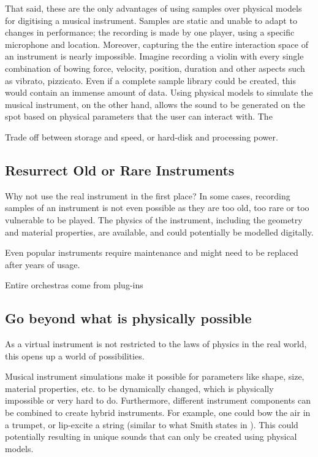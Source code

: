 That said, these are the only advantages of using samples over physical models for digitising a musical instrument. Samples are static and unable to adapt to changes in performance; the recording is made by one player, using a specific microphone and location. Moreover, capturing the the entire interaction space of an instrument is nearly impossible. Imagine recording a violin with every single combination of bowing force, velocity, position, duration and other aspects such as vibrato, pizzicato. Even if a complete sample library could be created, this would contain an immense amount of data. Using physical models to simulate the musical instrument, on the other hand, allows the sound to be generated on the spot based on physical parameters that the user can interact with. The 

Trade off between storage and speed, or hard-disk and processing power.


\subsection{Resurrect Old or Rare Instruments}
Why not use the real instrument in the first place? 
In some cases, recording samples of an instrument is not even possible as they are too old, too rare or too vulnerable to be played. The physics of the instrument, including the geometry and material properties, are available, and could potentially be modelled digitally. 


Even popular instruments require maintenance and might need to be replaced after years of usage. 

Entire orchestras come from plug-ins


\subsection{Go beyond what is physically possible} 
As a virtual  instrument is not restricted to the laws of physics in the real world, this opens up a world of possibilities.

Musical instrument simulations make it possible for parameters like shape, size, material properties, etc. to be dynamically changed, which is physically impossible or very hard to do. Furthermore, different instrument components can be combined to create hybrid instruments. For example, one could bow the air in a trumpet, or lip-excite a string (similar to what Smith states in \cite{Smith2010a}). This could potentially resulting in unique sounds that can only be created using physical models.

